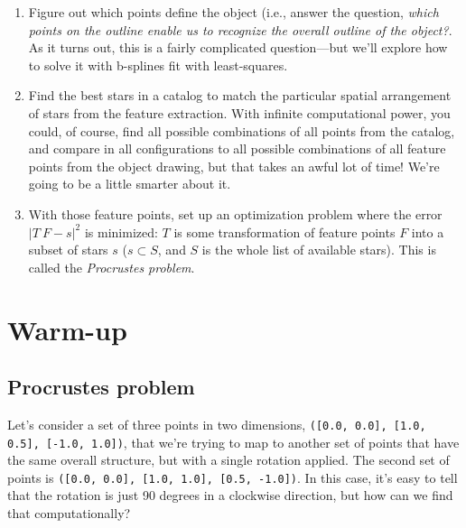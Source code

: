\documentclass{article}
\begin{document}
\begin{enumerate}
\item Figure out which points define the object (i.e., answer the question, \textit{which points on the outline enable us to recognize the overall outline of the object?}. As it turns out, this is a fairly complicated question---but we'll explore how to solve it with b-splines fit with least-squares.

\item Find the best stars in a catalog to match the particular spatial arrangement of stars from the feature extraction. With infinite computational power, you could, of course, find all possible combinations of all points from the catalog, and compare in all configurations to all possible combinations of all feature points from the object drawing, but that takes an awful lot of time! We're going to be a little smarter about it.

\item With those feature points, set up an optimization problem where the error $|T~F - s|^2$ is minimized: $T$ is some transformation of feature points $F$ into a subset of stars $s$ ($s \subset S$, and $S$ is the whole list of available stars). This is called the \textit{Procrustes problem}.
\end{enumerate}


\section{Warm-up}

\subsection{Procrustes problem}

Let's consider a set of three points in two dimensions, \texttt{([0.0, 0.0], [1.0, 0.5], [-1.0, 1.0])}, that we're trying to map to another set of points that have the same overall structure, but with a single rotation applied. The second set of points is \texttt{([0.0, 0.0], [1.0, 1.0], [0.5, -1.0])}. In this case, it's easy to tell that the rotation is just 90 degrees in a clockwise direction, but how can we find that computationally?
\end{document}
